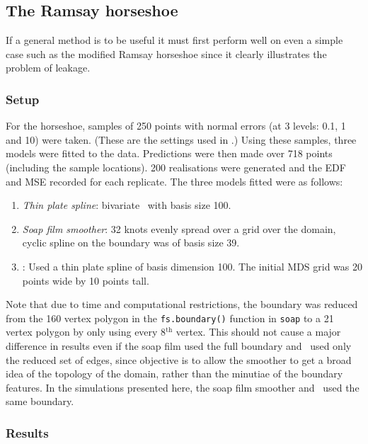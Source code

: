 \subsection{The Ramsay horseshoe}

If a general method is to be useful it must first perform well on even a simple case such as the modified Ramsay horseshoe since it clearly illustrates the problem of leakage.

\subsubsection{Setup}

For the horseshoe, samples of 250 points with normal errors (at 3 levels: 0.1, 1 and 10) were taken. (These are the settings used in \cite{soap}.) Using these samples, three models were fitted to the data. Predictions were then made over 718 points (including the sample locations). 200 realisations were generated and the EDF and MSE recorded for each replicate. The three models fitted were as follows:

\begin{enumerate}
\item \emph{Thin plate spline}: bivariate \tprs\  with basis size 100.
\item \emph{Soap film smoother}: 32 knots evenly spread over a grid over the domain, cyclic spline on the boundary was of basis size 39.
\item \emph{\mdsap}: Used a thin plate spline of basis dimension 100. The initial MDS grid was 20 points wide by 10 points tall.
\end{enumerate} 

Note that due to time and computational restrictions, the boundary was reduced from the 160 vertex polygon in the \texttt{fs.boundary()} function in \texttt{soap} to a 21 vertex polygon by only using every 8$^\text{th}$ vertex. This should not cause a major difference in results even if the soap film used the full boundary and \mdsap\ used only the reduced set of edges, since objective is to allow the smoother to get a broad idea of the topology of the domain, rather than the minutiae of the boundary features. In the simulations presented here, the soap film smoother and \mdsap\ used the same boundary.

\subsubsection{Results}

